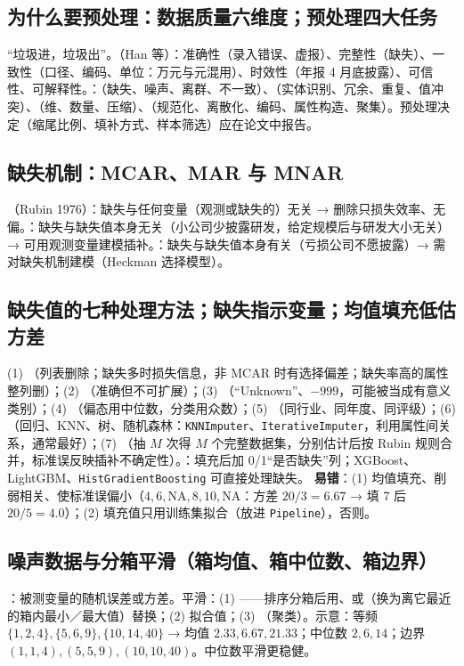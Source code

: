 \subsection{为什么要预处理：数据质量六维度；预处理四大任务}
“垃圾进，垃圾出”。（Han 等）：准确性（录入错误、虚报）、完整性（缺失）、一致性（口径、编码、单位：万元与元混用）、时效性（年报 4 月底披露）、可信性、可解释性。：（缺失、噪声、离群、不一致）、（实体识别、冗余、重复、值冲突）、（维、数量、压缩）、（规范化、离散化、编码、属性构造、聚集）。预处理决定（缩尾比例、填补方式、样本筛选）应在论文中报告。

\subsection{缺失机制：MCAR、MAR 与 MNAR}
（Rubin 1976）：缺失与任何变量（观测或缺失的）无关 → 删除只损失效率、无偏。：缺失与缺失值本身无关（小公司少披露研发，给定规模后与研发大小无关）→ 可用观测变量建模插补。：缺失与缺失值本身有关（亏损公司不愿披露）→ 需对缺失机制建模（Heckman 选择模型）。

\subsection{缺失值的七种处理方法；缺失指示变量；均值填充低估方差}
(1) （列表删除；缺失多时损失信息，非 MCAR 时有选择偏差；缺失率高的属性整列删）；(2) （准确但不可扩展）；(3) （“Unknown”、$-999$，可能被当成有意义类别）；(4) （偏态用中位数，分类用众数）；(5) （同行业、同年度、同评级）；(6) （回归、KNN、树、随机森林：\texttt{KNNImputer}、\texttt{IterativeImputer}，利用属性间关系，通常最好）；(7) （抽 $M$ 次得 $M$ 个完整数据集，分别估计后按 Rubin 规则合并，标准误反映插补不确定性）。：填充后加 0/1“是否缺失”列；XGBoost、LightGBM、\texttt{HistGradientBoosting} 可直接处理缺失。
\textbf{易错}：(1) 均值填充、削弱相关、使标准误偏小（$4,6,\text{NA},8,10,\text{NA}$：方差 $20/3=6.67$ → 填 7 后 $20/5=4.0$）；(2) 填充值只用训练集拟合（放进 \texttt{Pipeline}），否则。

\subsection{噪声数据与分箱平滑（箱均值、箱中位数、箱边界）}
：被测变量的随机误差或方差。平滑：(1) ——排序分箱后用、或（换为离它最近的箱内最小／最大值）替换；(2) 拟合值；(3) （聚类）。示意：等频 $\{1,2,4\},\{5,6,9\},\{10,14,40\}$ → 均值 $2.33,6.67,21.33$；中位数 $2,6,14$；边界 $(1,1,4),(5,5,9),(10,10,40)$。中位数平滑更稳健。

